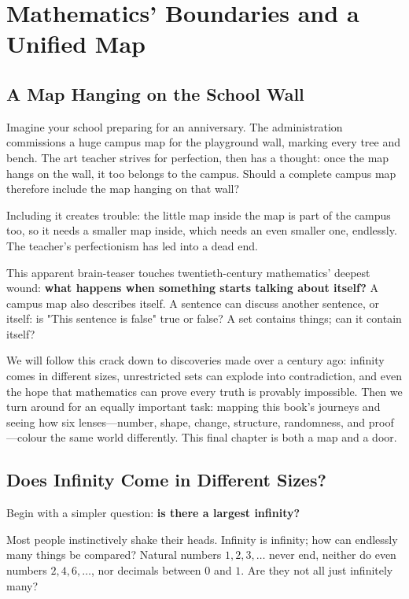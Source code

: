 \chapter{Mathematics' Boundaries and a Unified Map}

\section{A Map Hanging on the School Wall}

Imagine your school preparing for an anniversary. The administration commissions a huge campus map for the playground wall, marking every tree and bench. The art teacher strives for perfection, then has a thought: once the map hangs on the wall, it too belongs to the campus. Should a complete campus map therefore include the map hanging on that wall?

Including it creates trouble: the little map inside the map is part of the campus too, so it needs a smaller map inside, which needs an even smaller one, endlessly. The teacher's perfectionism has led into a dead end.

This apparent brain-teaser touches twentieth-century mathematics' deepest wound: \textbf{what happens when something starts talking about itself?} A campus map also describes itself. A sentence can discuss another sentence, or itself: is "This sentence is false" true or false? A set contains things; can it contain itself?

We will follow this crack down to discoveries made over a century ago: infinity comes in different sizes, unrestricted sets can explode into contradiction, and even the hope that mathematics can prove every truth is provably impossible. Then we turn around for an equally important task: mapping this book's journeys and seeing how six lenses---number, shape, change, structure, randomness, and proof---colour the same world differently. This final chapter is both a map and a door.

\section{Does Infinity Come in Different Sizes?}

Begin with a simpler question: \textbf{is there a largest infinity?}

Most people instinctively shake their heads. Infinity is infinity; how can endlessly many things be compared? Natural numbers $1, 2, 3, \ldots$ never end, neither do even numbers $2, 4, 6, \ldots$, nor decimals between $0$ and $1$. Are they not all just infinitely many?

